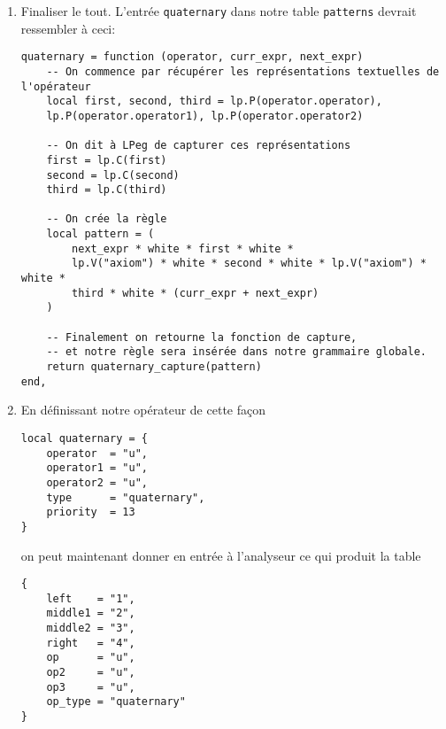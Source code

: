 \documentclass{article}
\begin{document}
\begin{enumerate}
	\begin{verbatim}
-- p est la règle
function quaternary_capture (p)
	-- On utilise l'opérateur de capture de LPeg
	return p / function (left, op1, middle1, op2, middle2, op3, right)
		-- Et on retourne juste une table.
		-- A savoir: on pourrait utiliser la fonction lpeg.Ct (Capture table),
		-- cependant il est préférable de définir nos clés nous-même, car lpeg.Ct
		-- retourne une table dont les clés sont des nombres (1, 2, ...)
		return {
			left    = left,
			op      = op1,
			op2     = op2,
			op3     = op3,
			middle1 = middle1,
			middle2 = middle2,
			right   = right,
			op_type = "quaternary"
		}
	end
end
	\end{verbatim}
	\item Finaliser le tout. L'entrée \lstinline|quaternary| dans notre table \lstinline|patterns| devrait ressembler à ceci:
	\begin{verbatim}
quaternary = function (operator, curr_expr, next_expr)
	-- On commence par récupérer les représentations textuelles de l'opérateur
	local first, second, third = lp.P(operator.operator), 
	lp.P(operator.operator1), lp.P(operator.operator2)
	
	-- On dit à LPeg de capturer ces représentations
	first = lp.C(first)
	second = lp.C(second)
	third = lp.C(third)
	
	-- On crée la règle
	local pattern = (
		next_expr * white * first * white *
		lp.V("axiom") * white * second * white * lp.V("axiom") * white *
		third * white * (curr_expr + next_expr)
	)
	
	-- Finalement on retourne la fonction de capture, 
	-- et notre règle sera insérée dans notre grammaire globale.
	return quaternary_capture(pattern)
end,
	\end{verbatim}
	\item En définissant notre opérateur de cette façon
	\begin{verbatim}
local quaternary = {
	operator  = "u",
	operator1 = "u",
	operator2 = "u",
	type      = "quaternary",
	priority  = 13
}
	\end{verbatim}
	on peut maintenant donner  en entrée à l'analyseur ce qui produit la table
	\begin{verbatim}
{ 
	left    = "1",
	middle1 = "2",
	middle2 = "3",
	right   = "4",
	op      = "u",
	op2     = "u",
	op3     = "u", 
	op_type = "quaternary" 
}
	\end{verbatim}
\end{enumerate}
\end{document}
